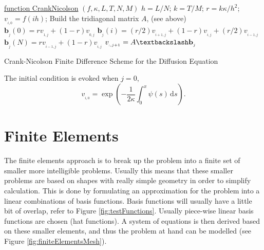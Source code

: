 \documentclass[undefended]{sfuthesis}
\begin{document}
\begin{algorithm}[h!]
	\underline{function CrankNicolson} $(f, \kappa, L, T, N, M)$\;
	$h = L/N$; 
	$k = T/M$; 
	$r = k\kappa/h^2$; 
	{
		$v_{_{i, 0}} = f(ih)$; 
	}
	Build the tridiagonal matrix $A$, (see above)\;
	{
		$\textbf{b}_{_j}(0) = rv_{_{1, j}} + (1 - r) v_{_{0, j}}$\;
		{
			$\textbf{b}_{_j}(i) = (r/2) v_{_{i + 1, j}} + (1 - r) v_{_{i, j}} + (r/2) v_{_{i - 1, j}}$\;
		}
		$\textbf{b}_{_j}(N) = rv_{_{i - 1, j}} + (1 - r) v_{_{i, j}}$\;
		$v_{_{:, j + 1}} = A \textbackslash \textbf{b}_{_{j}}$ 
	}
	\caption{Crank-Nicolson Finite Difference Scheme for the Diffusion Equation}
	\label{alg:CrankNicolson}
\end{algorithm}

The initial condition is evoked when $j = 0$, \[v_{_{i, 0}} = \exp \left(- \frac{1}{2 \kappa} \int_{0}^{x} \psi(s) \,\mathrm{d} s \right).\] 

\section{Finite Elements}

The finite elements approach is to break up the problem into a finite set of smaller more intelligible problems. Usually this means that these smaller problems are based on shapes with really simple geometry in order to simplify calculation. This is done by formulating an approximation for the problem into a linear combinations of basis functions. Basis functions will usually have a little bit of overlap, refer to Figure \ref{fig:testFunctions}. Usually piece-wise linear basis functions are chosen (hat functions). A system of equations is then derived based on these smaller elements, and thus the problem at hand can be modelled (see Figure \ref{fig:finiteElementsMesh}). 
\end{document}
